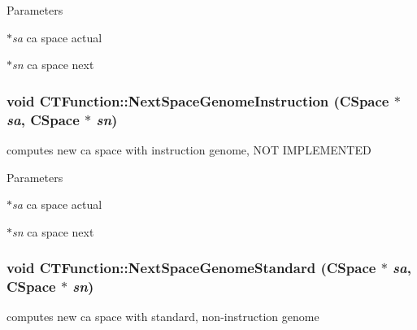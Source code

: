 \begin{DoxyParams}{Parameters}
\item[{\em $\ast$sa}]ca space actual \item[{\em $\ast$sn}]ca space next \end{DoxyParams}
\hypertarget{classCTFunction_a1e79617602ea9a77be8ee411daa39d6c}{
\subsubsection[{NextSpaceGenomeInstruction}]{\setlength{\rightskip}{0pt plus 5cm}void CTFunction::NextSpaceGenomeInstruction ({\bf CSpace} $\ast$ {\em sa}, \/  {\bf CSpace} $\ast$ {\em sn})}}
\label{classCTFunction_a1e79617602ea9a77be8ee411daa39d6c}
computes new ca space with instruction genome, NOT IMPLEMENTED


\begin{DoxyParams}{Parameters}
\item[{\em $\ast$sa}]ca space actual \item[{\em $\ast$sn}]ca space next \end{DoxyParams}
\hypertarget{classCTFunction_ac62d3fe86128f015892eccecfef0ddf8}{
\subsubsection[{NextSpaceGenomeStandard}]{\setlength{\rightskip}{0pt plus 5cm}void CTFunction::NextSpaceGenomeStandard ({\bf CSpace} $\ast$ {\em sa}, \/  {\bf CSpace} $\ast$ {\em sn})}}
\label{classCTFunction_ac62d3fe86128f015892eccecfef0ddf8}
computes new ca space with standard, non-\/instruction genome


